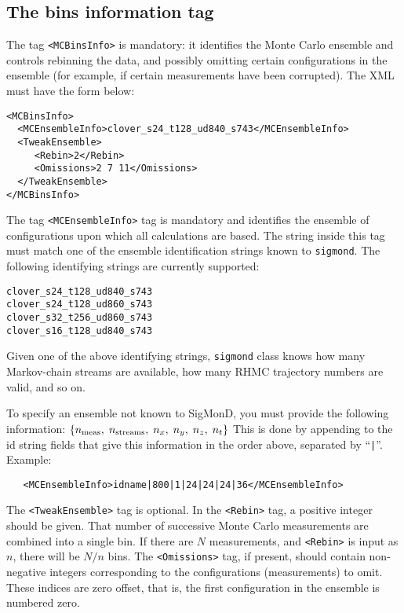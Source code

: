 \documentclass[12pt]{article}
\newcommand{\vb}{\texttt}
\begin{document}
\subsection{The bins information tag}

The tag \vb{<MCBinsInfo>} is mandatory: it identifies the Monte Carlo
ensemble and controls rebinning the data,
and possibly omitting certain configurations in the ensemble (for example,
if certain measurements have been corrupted).  The XML must have the form
below:
\begin{verbatim}
<MCBinsInfo>
  <MCEnsembleInfo>clover_s24_t128_ud840_s743</MCEnsembleInfo>
  <TweakEnsemble>
     <Rebin>2</Rebin>
     <Omissions>2 7 11</Omissions>
  </TweakEnsemble>
</MCBinsInfo>
\end{verbatim}
The tag \vb{<MCEnsembleInfo>} tag is mandatory and identifies the
ensemble of configurations upon which all calculations are based.
The string inside this tag must match one of the ensemble identification
strings known to \vb{sigmond}.
The following identifying strings are currently supported:
\begin{verbatim}
clover_s24_t128_ud840_s743
clover_s24_t128_ud860_s743
clover_s32_t256_ud860_s743
clover_s16_t128_ud840_s743
\end{verbatim}
Given one of the above identifying strings, \vb{sigmond} class knows how many
Markov-chain streams are available, how many RHMC trajectory numbers are
valid, and so on.

To specify an ensemble not known to SigMonD, you must provide
the following information:
$\{n_{\rm meas}, \; n_{\rm streams}, \; n_x, \; n_y, \; n_z, \; n_t\}$
This is done by appending to the id string fields that give
this information in the order above, separated by ``\vb{|}''.
Example:
\begin{verbatim}
   <MCEnsembleInfo>idname|800|1|24|24|24|36</MCEnsembleInfo>
\end{verbatim}

The \vb{<TweakEnsemble>} tag is optional.
In the \vb{<Rebin>} tag, a positive integer should be given.  That number of
successive Monte Carlo measurements are combined into a single bin.
If there are $N$ measurements, and \vb{<Rebin>} is input as $n$,
there will be $N/n$ bins. The \vb{<Omissions>} tag, if present,
should contain non-negative integers corresponding to the configurations
(measurements) to omit. These indices are zero offset, that is, the
first configuration in the ensemble is numbered zero.
\end{document}
